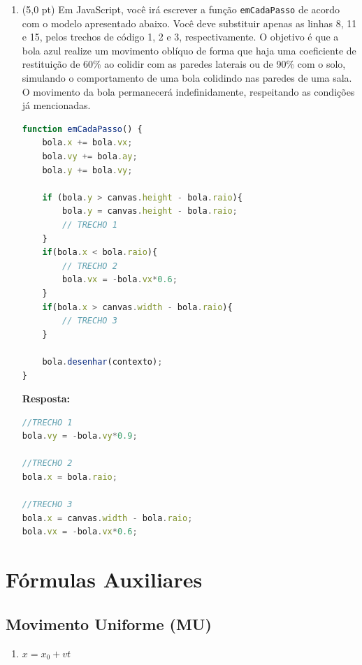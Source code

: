 \documentclass[12pt,a4paper,oneside]{article}
\begin{document}
\begin{enumerate}
	\newpage 
	
	\item (5,0 pt) Em JavaScript, você irá escrever a função {\tt emCadaPasso} de acordo com o modelo apresentado abaixo. Você deve substituir apenas as linhas 8, 11 e 15, pelos trechos de código 1, 2 e 3, respectivamente. O objetivo é que a bola azul realize um movimento oblíquo de forma que haja uma coeficiente de restituição de 60\% ao colidir com as paredes laterais ou de 90\% com o solo, simulando o comportamento de uma bola colidindo nas paredes de uma sala. O movimento da bola permanecerá indefinidamente, respeitando as condições já mencionadas.
	
	\begin{lstlisting}[language=JavaScript]
function emCadaPasso() {    
	bola.x += bola.vx;
	bola.vy += bola.ay;
	bola.y += bola.vy;
	
	if (bola.y > canvas.height - bola.raio){ 
		bola.y = canvas.height - bola.raio; 
		// TRECHO 1
	}
	if(bola.x < bola.raio){
		// TRECHO 2
		bola.vx = -bola.vx*0.6;
	}
	if(bola.x > canvas.width - bola.raio){
		// TRECHO 3 
	}
	
	bola.desenhar(contexto); 
}\end{lstlisting}

{\color{blue} {\bf Resposta:}}  \\
\begin{lstlisting}[language=JavaScript]
//TRECHO 1
bola.vy = -bola.vy*0.9;

//TRECHO 2
bola.x = bola.raio;

//TRECHO 3
bola.x = canvas.width - bola.raio;
bola.vx = -bola.vx*0.6;
\end{lstlisting}
	
	\end{enumerate}

\newpage

\section{Fórmulas Auxiliares}

\subsection{Movimento Uniforme (MU)}

\begin{enumerate}
	\item $x = x_0 + vt$ 
\end{enumerate}
\end{document}
